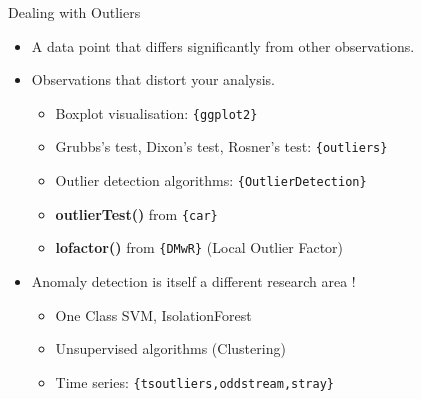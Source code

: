 \documentclass[12pt,ignorenonframetext,]{beamer}
\providecommand{\tightlist}{%
  \setlength{\itemsep}{0pt}\setlength{\parskip}{0pt}}
\begin{document}
\begin{frame}{Dealing with Outliers}
\protect\hypertarget{dealing-with-outliers}{}

\begin{itemize}
\tightlist
\item
  A data point that differs significantly from other observations.\\
  \vspace{2mm}
\item
  Observations that distort your analysis.

  \begin{itemize}
      \item Boxplot visualisation: \texttt{\{ggplot2\}}
      \item Grubbs’s test, Dixon’s test, Rosner’s test: \texttt{\{outliers\}}
      \item Outlier detection algorithms: \texttt{\{OutlierDetection\}}
      \item \textbf{outlierTest()} from \texttt{\{car\}}
      \item \textbf{lofactor()} from \texttt{\{DMwR\}} (Local Outlier Factor)
  \end{itemize}
   \vspace{2mm}
\item
  Anomaly detection is itself a different research area !

  \begin{itemize}
      \item One Class SVM, IsolationForest
      \item Unsupervised algorithms (Clustering)
      \item Time series: \texttt{\{tsoutliers,oddstream,stray\}}
  \end{itemize}
\end{itemize}

\end{frame}
\end{document}
